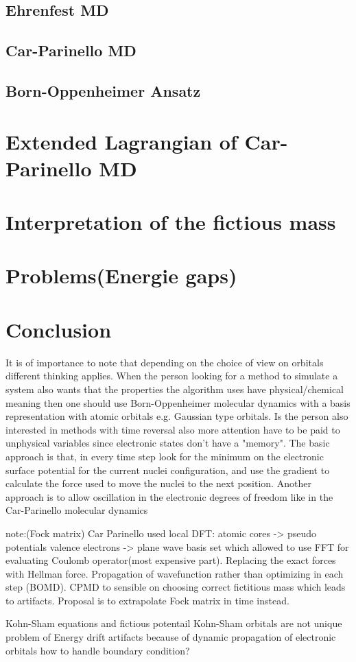 \documentclass[12pt]{scrartcl}
\begin{document}
\subsection{Ehrenfest MD}
\subsection{Car-Parinello MD}
\subsection{Born-Oppenheimer Ansatz}

\section{Extended Lagrangian of Car-Parinello MD}
\section{Interpretation of the fictious mass}
\section{Problems(Energie gaps)}
\section{Conclusion}
It is of importance to note that depending on the choice of view on orbitals different thinking applies. When the person looking for a method to simulate a system also wants that the properties the algorithm uses have physical/chemical meaning then one should use Born-Oppenheimer molecular dynamics with a basis representation with atomic orbitals e.g. Gaussian type orbitals. Is the person also interested in methods with time reversal also more attention have to be paid to unphysical variables since electronic states don't have a "memory". The basic approach is that, in every time step look for the minimum on the electronic surface potential for the current nuclei configuration, and use the gradient to calculate the force used to move the nuclei to the next position. Another approach is to allow oscillation in the electronic degrees of freedom like in the Car-Parinello molecular dynamics 






note:(Fock matrix)
Car Parinello used local DFT: atomic cores -> pseudo potentials
							  valence electrons -> plane wave basis set
which allowed to use FFT for evaluating Coulomb operator(most expensive part). Replacing the exact forces with Hellman force.  Propagation of wavefunction rather than optimizing in each step (BOMD). CPMD to sensible on choosing correct fictitious mass which leads to artifacts. Proposal is to extrapolate Fock matrix in time instead.




Kohn-Sham equations and fictious potentail
Kohn-Sham orbitals are not unique
problem of Energy drift
artifacts because of dynamic propagation of electronic orbitals
how to handle boundary condition?




\end{document}
